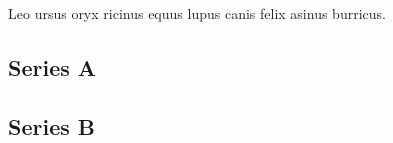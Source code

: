 \documentclass[draft]{article}
\begin{document}
\beginnumbering
\pstart
Leo  ursus  oryx  ricinus  equus 
lupus  canis  felix  asinus  burricus.

\pend
\endnumbering

\subsection*{Series A}
\subsection*{Series B}
\end{document}

